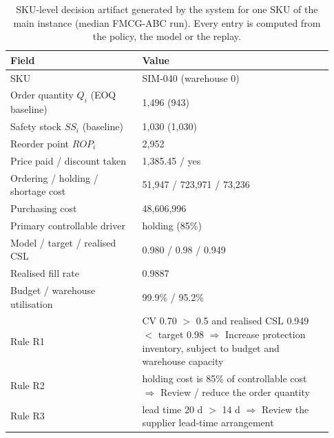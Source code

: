 \begin{table}[!t]
\centering
\footnotesize
\caption{SKU-level decision artifact generated by the system for one SKU of the main instance (median FMCG-ABC run). Every entry is computed from the policy, the model or the replay.}\label{tab:artifact}
\begin{tabular}{p{0.38\linewidth}p{0.55\linewidth}}
\toprule
Field & Value \\
\midrule
SKU & SIM-040 (warehouse 0) \\
Order quantity $Q_i$ (EOQ baseline) & 1,496 (943) \\
Safety stock $SS_i$ (baseline) & 1,030 (1,030) \\
Reorder point $ROP_i$ & 2,952 \\
Price paid / discount taken & 1,385.45 / yes \\
Ordering / holding / shortage cost & 51,947 / 723,971 / 73,236 \\
Purchasing cost & 48,606,996 \\
Primary controllable driver & holding (85\%) \\
Model / target / realised CSL & 0.980 / 0.98 / 0.949 \\
Realised fill rate & 0.9887 \\
Budget / warehouse utilisation & 99.9\% / 95.2\% \\
Rule R1 & CV 0.70 $>$ 0.5 and realised CSL 0.949 $<$ target 0.98 $\Rightarrow$ Increase protection inventory, subject to budget and warehouse capacity \\
Rule R2 & holding cost is 85\% of controllable cost $\Rightarrow$ Review / reduce the order quantity \\
Rule R3 & lead time 20 d $>$ 14 d $\Rightarrow$ Review the supplier lead-time arrangement \\
\bottomrule
\end{tabular}
\end{table}
